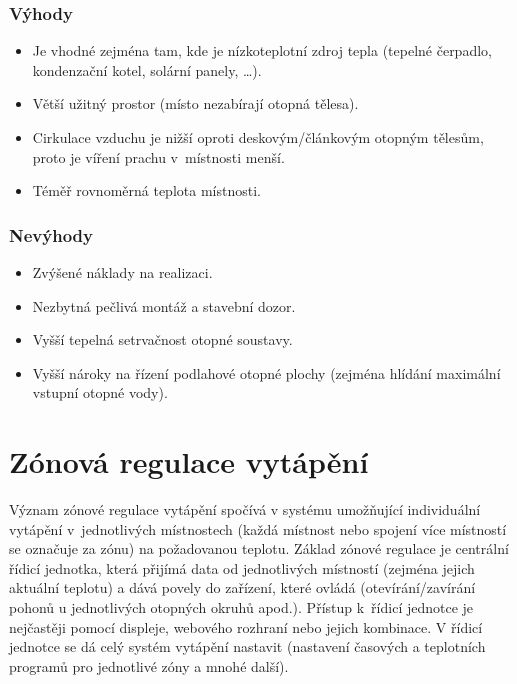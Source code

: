 \subsubsection{Výhody}

\begin{itemize}
  \item Je vhodné zejména tam, kde je nízkoteplotní zdroj tepla (tepelné čerpadlo, kondenzační kotel, solární panely, …).
  \item Větší užitný prostor (místo nezabírají otopná tělesa).
  \item Cirkulace vzduchu je nižší oproti deskovým/článkovým otopným tělesům, proto je víření prachu v~místnosti menší.
  \item Téměř rovnoměrná teplota místnosti.
\end{itemize}

\subsubsection{Nevýhody}

\begin{itemize}
  \item Zvýšené náklady na realizaci.
  \item Nezbytná pečlivá montáž a stavební dozor.
  \item Vyšší tepelná setrvačnost otopné soustavy.
  \item Vyšší nároky na řízení podlahové otopné plochy (zejména hlídání maximální vstupní otopné vody).
\end{itemize}

\section{Zónová regulace vytápění}

Význam zónové regulace vytápění spočívá v systému umožňující individuální vytápění v~jednotlivých místnostech (každá místnost nebo spojení více místností se označuje za zónu) na požadovanou teplotu.  Základ zónové regulace je centrální řídicí jednotka, která přijímá data od jednotlivých místností (zejména jejich aktuální teplotu) a dává povely do zařízení, které ovládá (otevírání/zavírání pohonů u jednotlivých otopných okruhů apod.). Přístup k~řídicí jednotce je nejčastěji pomocí displeje, webového rozhraní nebo jejich kombinace. V řídicí jednotce se dá celý systém vytápění nastavit (nastavení časových a teplotních programů pro jednotlivé zóny a mnohé další). \cite{matz-zonove-regulacni-systemy-a-jejich-vyuziti-pri-uspornem-efektivnim-vytapeni} 


